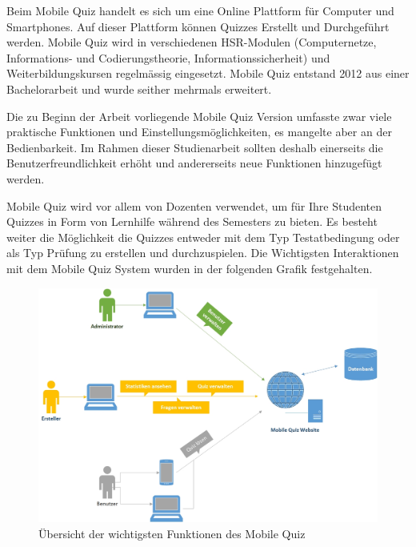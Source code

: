 
Beim Mobile Quiz handelt es sich um eine Online Plattform für Computer und Smartphones. Auf dieser Plattform können Quizzes Erstellt und Durchgeführt werden. Mobile Quiz wird in verschiedenen HSR-Modulen (Computernetze, Informations- und Codierungstheorie, Informationssicherheit) und Weiterbildungskursen regelmässig eingesetzt. Mobile Quiz entstand 2012 aus einer Bachelorarbeit und wurde seither mehrmals erweitert. 

\bigskip
Die zu Beginn der Arbeit vorliegende Mobile Quiz Version umfasste zwar viele praktische Funktionen und Einstellungsmöglichkeiten, es mangelte aber an der Bedienbarkeit. Im Rahmen dieser Studienarbeit sollten deshalb einerseits die Benutzerfreundlichkeit erhöht und andererseits neue Funktionen hinzugefügt werden.

\bigskip

Mobile Quiz wird vor allem von Dozenten verwendet, um für Ihre Studenten Quizzes in Form von Lernhilfe während des Semesters zu bieten. Es besteht weiter die Möglichkeit die Quizzes entweder mit dem Typ Testatbedingung oder als Typ Prüfung zu erstellen und durchzuspielen. Die Wichtigsten Interaktionen mit dem Mobile Quiz System wurden in der folgenden Grafik festgehalten.
\begin{figure}[H]
	\centering
	\includegraphics[width=1\textwidth]
	{Images/InteraktionMobileQuiz.jpg}
	\caption{Übersicht der wichtigsten Funktionen des Mobile Quiz}
\end{figure}

\bigskip


